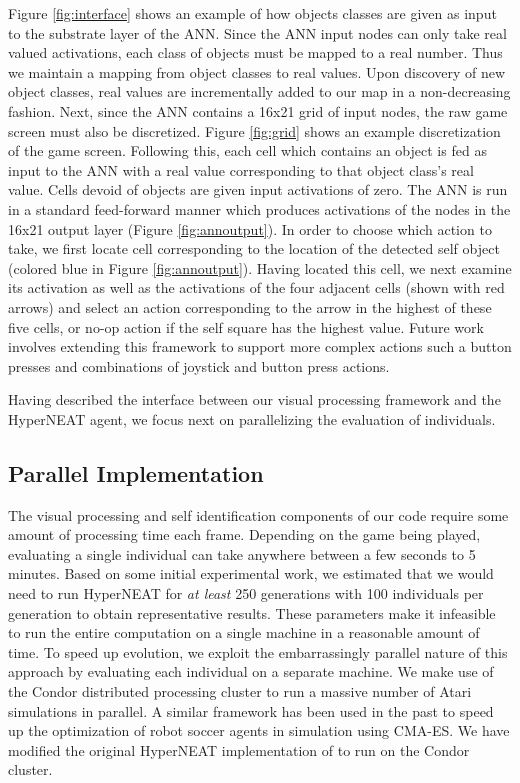 \documentclass{acm_proc_article-sp}
\begin{document}
Figure \ref{fig:interface} shows an example of how objects classes are given as input to the substrate layer of the ANN. Since the ANN input nodes can only take real valued activations, each class of objects must be mapped to a real number. Thus we maintain a mapping from object classes to real values. Upon discovery of new object classes, real values are incrementally added to our map in a non-decreasing fashion. Next, since the ANN contains a 16x21 grid of input nodes, the raw game screen must also be discretized. Figure \ref{fig:grid} shows an example discretization of the game screen. Following this, each cell which contains an object is fed as input to the ANN with a real value corresponding to that object class's real value. Cells devoid of objects are given input activations of zero. The ANN is run in a standard feed-forward manner which produces activations of the nodes in the 16x21 output layer (Figure \ref{fig:annoutput}). In order to choose which action to take, we first locate cell corresponding to the location of the detected self object (colored blue in Figure \ref{fig:annoutput}). Having located this cell, we next examine its activation as well as the activations of the four adjacent cells (shown with red arrows) and select an action corresponding to the arrow in the highest of these five cells, or no-op action if the self square has the highest value. Future work involves extending this framework to support more complex actions such a button presses and combinations of joystick and button press actions.

Having described the interface between our visual processing framework and the HyperNEAT agent, we focus next on parallelizing the evaluation of individuals.

\subsection{Parallel Implementation}
\label{sec:condor}
The visual processing and self identification components of our code require some amount of processing time each frame. Depending on the game being played, evaluating a single individual can take anywhere between a few seconds to 5 minutes. Based on some initial experimental work, we estimated that we would need to run HyperNEAT for \textit{at least} 250 generations with 100 individuals per generation to obtain representative results. These parameters make it infeasible to run the entire computation on a single machine in a reasonable amount of time. To speed up evolution, we exploit the embarrassingly parallel nature of this approach by evaluating each individual on a separate machine. We make use of the Condor distributed processing cluster \cite{thain2005distributed} to run a massive number of Atari simulations in parallel. A similar framework has been used in the past to speed up the optimization of robot soccer agents in simulation using CMA-ES\cite{Urieli+MKBS:2010}. We have modified the original HyperNEAT implementation of \cite{verbancsics10} to run on the Condor cluster.
\end{document}
